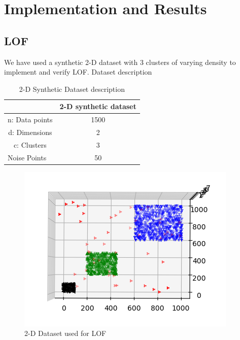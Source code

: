 \chapter{Implementation and Results}\label{Implementation and Results}

\section{LOF}
We have used a synthetic 2-D dataset with 3 clusters of varying density to implement and verify LOF.
Dataset description\\
\begin{table}[H]
	\centering
	\caption{2-D Synthetic Dataset description}
	\label{my-label}
	\begin{tabular}{|l|l|}
		\hline
		& \multicolumn{1}{c|}{2-D synthetic dataset} \\ \hline
		\multicolumn{1}{|c|}{n: Data points} & \multicolumn{1}{c|}{1500}                  \\ \hline
		
		\multicolumn{1}{|c|}{d: Dimensions}  & \multicolumn{1}{c|}{2}                     \\ \hline
		\multicolumn{1}{|c|}{c: Clusters}  & \multicolumn{1}{c|}{3}                     \\ \hline
		
		
		
		Noise Points                         & \multicolumn{1}{c|}{50}                                         \\ \hline
	\end{tabular}
\end{table}

\begin{figure}[H]
	\centering
	\includegraphics{chap04/LOF_dataset.png}
	\caption{2-D Dataset used for LOF}
\end{figure}

